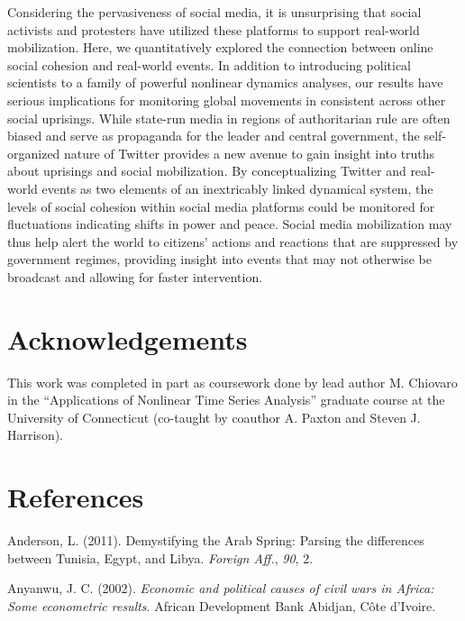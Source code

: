 \documentclass[english,man]{apa6}
\begin{document}
Considering the pervasiveness of social media, it is unsurprising that social
activists and protesters have utilized these platforms to support real-world
mobilization. Here, we quantitatively explored the connection between online
social cohesion and real-world events. In addition to introducing political
scientists to a family of powerful nonlinear dynamics analyses, our results have
serious implications for monitoring global movements in consistent across other
social uprisings. While state-run media in regions of authoritarian rule are
often biased and serve as propaganda for the leader and central government, the
self-organized nature of Twitter provides a new avenue to gain insight into
truths about uprisings and social mobilization. By conceptualizing Twitter and
real-world events as two elements of an inextricably linked dynamical system,
the levels of social cohesion within social media platforms could be monitored
for fluctuations indicating shifts in power and peace. Social media mobilization
may thus help alert the world to citizens' actions and reactions that are
suppressed by government regimes, providing insight into events that may not
otherwise be broadcast and allowing for faster intervention.

\hypertarget{acknowledgements}{%
\section{Acknowledgements}\label{acknowledgements}}

This work was completed in part as coursework done by lead author M. Chiovaro in
the \enquote{Applications of Nonlinear Time Series Analysis} graduate course at the
University of Connecticut (co-taught by coauthor A. Paxton and Steven J.
Harrison).

\newpage

\hypertarget{references}{%
\section{References}\label{references}}

\begingroup
\setlength{\parindent}{-0.5in}
\setlength{\leftskip}{0.5in}

\hypertarget{refs}{}
\leavevmode\hypertarget{ref-anderson2011demystifying}{}%
Anderson, L. (2011). Demystifying the Arab Spring: Parsing the differences between Tunisia, Egypt, and Libya. \emph{Foreign Aff.}, \emph{90}, 2.

\leavevmode\hypertarget{ref-anyanwu2002economic}{}%
Anyanwu, J. C. (2002). \emph{Economic and political causes of civil wars in Africa: Some econometric results}. African Development Bank Abidjan, Côte d'Ivoire.
\end{document}

